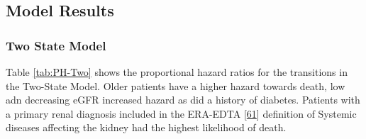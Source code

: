 \documentclass[
]{article}
\begin{document}
\hypertarget{model-results}{%
\subsection{Model Results}\label{model-results}}

\hypertarget{two-state-model}{%
\subsubsection{Two State Model}\label{two-state-model}}

Table \ref{tab:PH-Two} shows the proportional hazard ratios for the transitions in the Two-State Model. Older patients have a higher hazard towards death, low adn decreasing eGFR increased hazard as did a history of diabetes. Patients with a primary renal diagnosis included in the ERA-EDTA {[}\protect\hyperlink{ref-venkat-raman_new_2012}{61}{]} definition of Systemic diseases affecting the kidney had the highest likelihood of death.
\end{document}
